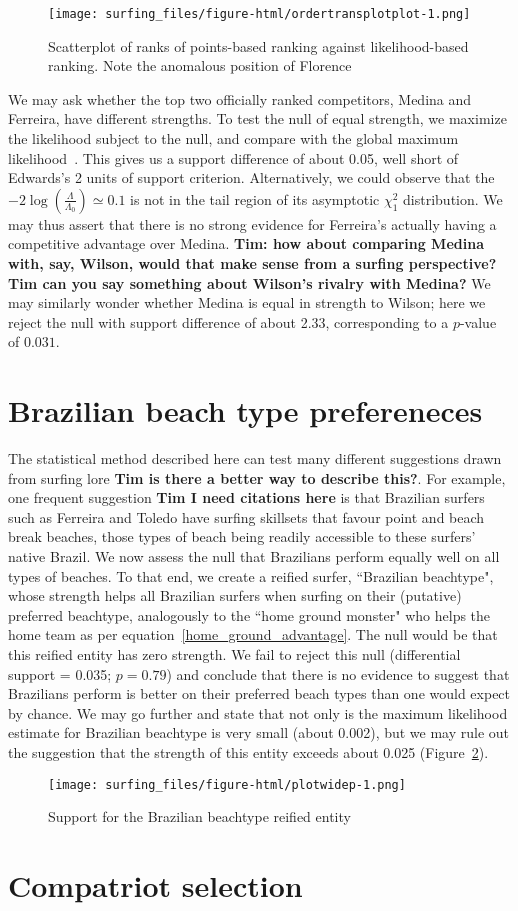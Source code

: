 \documentclass{article}
\begin{document}
\begin{figure}[h]
\texttt{[image: surfing\_files/figure-html/ordertransplotplot-1.png]}
\caption{Scatterplot of ranks \label{compare_likelihood_points_rankings} of points-based ranking
against likelihood-based ranking.  Note the anomalous position of
Florence}
\end{figure}

We may ask whether the top two officially ranked competitors, Medina
and Ferreira, have different strengths.  To test the null of equal
strength, we maximize the likelihood subject to the null, and compare
with the global maximum likelihood~\cite{hankin2010}.  This gives us a
support difference of about 0.05, well short of Edwards's 2 units of
support criterion.  Alternatively, we could observe that the
$-2\log\left(\frac{\Lambda}{\Lambda_0}\right)\simeq 0.1$ is not in the tail
region of its asymptotic $\chi^2_1$ distribution.  We may thus assert
that there is no strong evidence for Ferreira's actually having a
competitive advantage over Medina.  {\bf Tim: how about comparing
  Medina with, say, Wilson, would that make sense from a surfing
  perspective? Tim can you say something about Wilson's rivalry with
  Medina?}  We may similarly wonder whether Medina is equal in
strength to Wilson; here we reject the null with support difference of
about 2.33, corresponding to a $p$-value of $0.031$.

\section{Brazilian beach type prefereneces}

The statistical method described here can test many different
suggestions drawn from surfing lore {\bf Tim is there a better way to
  describe this?}.  For example, one frequent suggestion {\bf Tim I
  need citations here} is that Brazilian surfers such as Ferreira and
Toledo have surfing skillsets that favour point and beach break
beaches, those types of beach being readily accessible to these
surfers' native Brazil.  We now assess the null that Brazilians
perform equally well on all types of beaches.  To that end, we create
a reified surfer, ``Brazilian beachtype", whose strength helps all
Brazilian surfers when surfing on their (putative) preferred
beachtype, analogously to the ``home ground monster" who helps the
home team as per equation~\ref{home_ground_advantage}.  The null would
be that this reified entity has zero strength.  We fail to reject this
null (differential support = 0.035; $p=0.79$) and conclude that there
is no evidence to suggest that Brazilians perform is better on their
preferred beach types than one would expect by chance.  We may go
further and state that not only is the maximum likelihood estimate for
Brazilian beachtype is very small (about 0.002), but we may rule out
the suggestion that the strength of this entity exceeds about 0.025
(Figure~\ref{brazilian_beachtype_support}).

\begin{figure}
  \texttt{[image: surfing\_files/figure-html/plotwidep-1.png]}
\caption{Support \label{brazilian_beachtype_support} for the Brazilian beachtype reified entity}
\end{figure}


\section{Compatriot selection}


\end{document}
